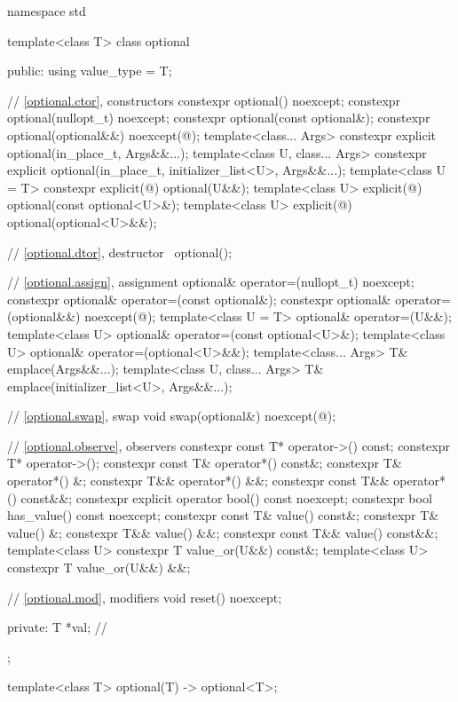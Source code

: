 \begin{codeblock}
namespace std {
  template<class T>
  class optional {
  public:
    using value_type = T;

    // \ref{optional.ctor}, constructors
    constexpr optional() noexcept;
    constexpr optional(nullopt_t) noexcept;
    constexpr optional(const optional&);
    constexpr optional(optional&&) noexcept(@\seebelow@);
    template<class... Args>
      constexpr explicit optional(in_place_t, Args&&...);
    template<class U, class... Args>
      constexpr explicit optional(in_place_t, initializer_list<U>, Args&&...);
    template<class U = T>
      constexpr explicit(@\seebelow@) optional(U&&);
    template<class U>
      explicit(@\seebelow@) optional(const optional<U>&);
    template<class U>
      explicit(@\seebelow@) optional(optional<U>&&);

    // \ref{optional.dtor}, destructor
    ~optional();

    // \ref{optional.assign}, assignment
    optional& operator=(nullopt_t) noexcept;
    constexpr optional& operator=(const optional&);
    constexpr optional& operator=(optional&&) noexcept(@\seebelow@);
    template<class U = T> optional& operator=(U&&);
    template<class U> optional& operator=(const optional<U>&);
    template<class U> optional& operator=(optional<U>&&);
    template<class... Args> T& emplace(Args&&...);
    template<class U, class... Args> T& emplace(initializer_list<U>, Args&&...);

    // \ref{optional.swap}, swap
    void swap(optional&) noexcept(@\seebelow@);

    // \ref{optional.observe}, observers
    constexpr const T* operator->() const;
    constexpr T* operator->();
    constexpr const T& operator*() const&;
    constexpr T& operator*() &;
    constexpr T&& operator*() &&;
    constexpr const T&& operator*() const&&;
    constexpr explicit operator bool() const noexcept;
    constexpr bool has_value() const noexcept;
    constexpr const T& value() const&;
    constexpr T& value() &;
    constexpr T&& value() &&;
    constexpr const T&& value() const&&;
    template<class U> constexpr T value_or(U&&) const&;
    template<class U> constexpr T value_or(U&&) &&;

    // \ref{optional.mod}, modifiers
    void reset() noexcept;

  private:
    T *val;         // \expos
  };

  template<class T>
    optional(T) -> optional<T>;
}
\end{codeblock}

